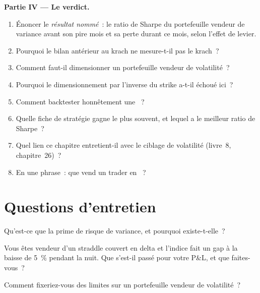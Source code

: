 \begin{problem}
\medskip\noindent\textbf{Partie IV --- Le verdict.}
\begin{enumerate}[resume]
\item Énoncer le \emph{résultat nommé}~: le ratio de Sharpe du portefeuille vendeur de variance avant son pire mois et sa perte durant ce mois, selon l'effet de levier.
\item Pourquoi le bilan antérieur au krach ne mesure-t-il pas le krach~?
\item Comment faut-il dimensionner un portefeuille vendeur de volatilité~?
\item Pourquoi le dimensionnement par l'inverse du strike a-t-il échoué ici~?
\item Comment backtester honnêtement une ~?
\item Quelle fiche de stratégie gagne le plus souvent, et lequel a le meilleur ratio de Sharpe~?
\item Quel lien ce chapitre entretient-il avec le ciblage de volatilité (livre~8, chapitre~26)~?
\item En une phrase~: que vend un trader en ~?
\end{enumerate}
\end{problem}

\section{Questions d'entretien}

\begin{interviewq}\label{iq:s2:harvesting-the-variance-risk-premium:1}
Qu'est-ce que la prime de risque de variance, et pourquoi existe-t-elle~?
\end{interviewq}

\begin{interviewq}\label{iq:s2:harvesting-the-variance-risk-premium:2}
Vous êtes vendeur d'un straddle couvert en delta et l'indice fait un gap à la baisse de 5~\% pendant la nuit. Que s'est-il passé pour votre P\&L, et que faites-vous~?
\end{interviewq}

\begin{interviewq}\label{iq:s2:harvesting-the-variance-risk-premium:3}
Comment fixeriez-vous des limites sur un portefeuille vendeur de volatilité~?
\end{interviewq}

